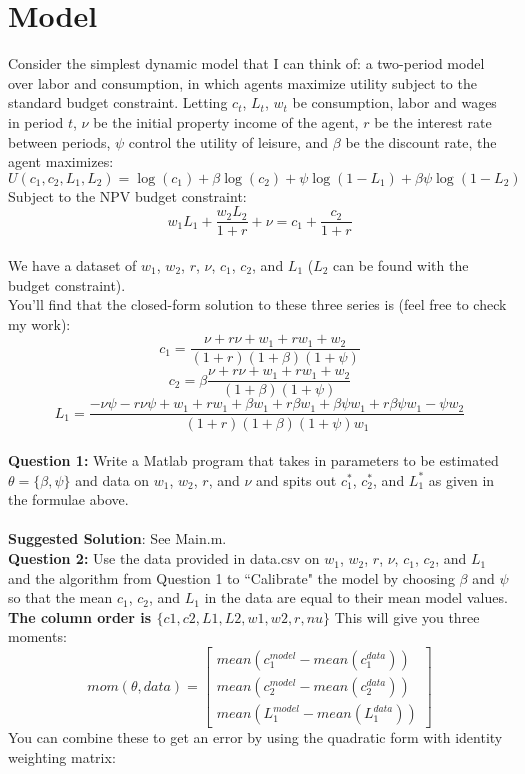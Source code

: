 \documentclass[11pt]{article}
\begin{document}
\section{Model}
Consider the simplest dynamic model that I can think of: a two-period model over labor and consumption, in which agents maximize utility subject to the standard budget constraint.  Letting $c_t$, $L_t$, $w_t$ be consumption, labor and wages in period $t$, $\nu$ be the initial property income of the agent,  $r$ be the interest rate between periods, $\psi$ control the utility of leisure, and $\beta$ be the discount rate, the agent maximizes:
$$U(c_1,c_2,L_1,L_2)=\log(c_1)+\beta\log(c_2)+\psi\log(1-L_1)+\beta\psi\log(1-L_2)$$
Subject to the NPV budget constraint:
$$w_1L_1+\frac{w_2L_2}{1+r}+\nu=c_1+\frac{c_2}{1+r}$$
\ \\
We have a dataset of $w_1$, $w_2$, $r$, $\nu$, $c_1$, $c_2$, and $L_1$ ($L_2$ can be found with the budget constraint).  \
\ \\
You'll find that the closed-form solution to these three series is (feel free to check my work):
$$c_1=\frac{\nu+r \nu+w_1+r w_1+w_2}{(1+r) (1+\beta) (1+\psi)}$$
$$c_2=\beta\frac{\nu+r \nu+w_1+r w_1+w_2}{(1+\beta) (1+\psi)}$$
$$L_1=\frac{-\nu \psi-r \nu \psi+w_1+r w_1+\beta w_1+r \beta w_1+\beta \psi w_1+r \beta \psi w_1-\psi w_2}{(1+r) (1+\beta) (1+\psi) w_1}$$
\ \\
\textbf{Question 1:} Write a Matlab program that takes in parameters to be estimated $\theta=\{\beta,\psi\}$ and data on $w_1$, $w_2$, $r$, and $\nu$ and spits out $c_1^*$, $c_2^*$, and $L_1^*$ as given in the formulae above.  \\
\ \\
\textbf{Suggested Solution}:  See Main.m.
\ \\
\textbf{Question 2:}  Use the data provided in data.csv on $w_1$, $w_2$, $r$, $\nu$, $c_1$, $c_2$, and $L_1$ and the algorithm from Question 1 to ``Calibrate" the model by choosing $\beta$ and $\psi$ so that the mean $c_1$, $c_2$, and $L_1$ in the data are equal to their mean model values.  \textbf{The column order is $\{c1,c2,L1,L2,w1,w2,r,nu\}$ }This will give you three moments:
$$mom(\theta,data)=\left[\begin{array}{c}mean(c_1^{model}-mean(c_1^{data})) \\ mean(c_2^{model}-mean(c_2^{data})) \\ mean(L_1^{model}-mean(L_1^{data}))\end{array}\right]$$
You can combine these to get an error by using the quadratic form with identity weighting matrix:
\end{document}
